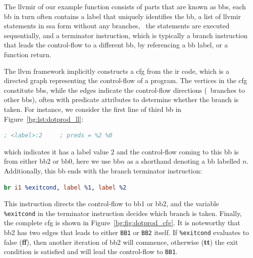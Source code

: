 The \gls{llvmir} of our example function consists of parts that are known
as \glspl{bb}, each \gls{bb} in turn often contains a label that uniquely
identifies the \gls{bb}, a list of \gls{llvmir} statements in \gls{ssa} form
without any branches, \ie~the statements are executed sequentially, and a
terminator instruction, which is typically a branch instruction that leads the
control-flow to a different \gls{bb}, by referencing a \gls{bb} label, or a
function return.

The \gls{llvm} framework implicitly constructs a \gls{cfg} from the \gls{ir}
code, which is a directed graph representing the control-flow of a program.
The vertices in the \gls{cfg} constitute \glspl{bb}, while the edges indicate
the control-flow directions (\ie~branches to other \glspl{bb}), often with
predicate attributes to determine whether the branch is taken.  For instance,
we consider the first line of third \gls{bb} in Figure~\ref{bg:lst:dotprod_ll}:
\begin{lstlisting}[language=LLVM]
    ; <label>:2     ; preds = %2 %0
\end{lstlisting}\vspace{-15pt}
which indicates it has a label value $2$ and the control-flow coming to this
\gls{bb} is from either \gls{bb}2 or \gls{bb}0, here we use \gls{bb}$n$ as a
shorthand denoting a \gls{bb} labelled $n$.  Additionally, this \gls{bb} ends
with the branch terminator instruction:
\begin{lstlisting}[language=LLVM]
    br i1 %exitcond, label %1, label %2
\end{lstlisting}\vspace{-15pt}
This instruction directs the control-flow to \gls{bb}1 or \gls{bb}2,
and the variable \verb|%exitcond| in the terminator instruction decides
which branch is taken.  Finally, the complete \gls{cfg} is shown in
Figure~\ref{bg:fig:dotprod_cfg}.  It is noteworthy that \gls{bb}2 has two edges
that leads to either \verb|BB1| or \verb|BB2| itself.  If \verb|%exitcond|
evaluates to false (\textbf{ff}), then another iteration of \gls{bb}2 will
commence, otherwise (\textbf{tt}) the exit condition is satisfied and will lead
the control-flow to \verb|BB1|.
